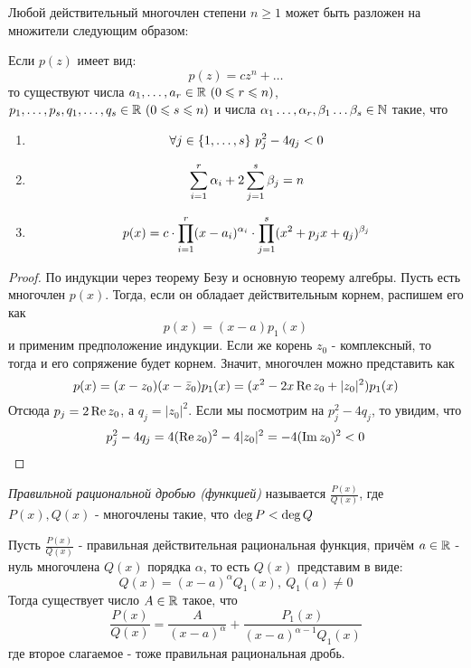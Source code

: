 \begin{corollary}
	Любой действительный многочлен степени $n \ge 1$ может быть разложен на множители следующим образом:
	
	Если $p(z)$ имеет вид:
	\[
		p(z) = cz^n + \ldots
	\]
	то существуют числа $a_1, \ldots, a_r \in \R\ (0 \le r \le n)$, $p_1, \ldots, p_s, q_1, \ldots, q_s \in \mathbb{R}\ (0 \leqslant s \leqslant n)$ и числа $\alpha_1 \ldots, \alpha_r, \beta_1 \ldots \beta_s \in \mathbb{N}$ такие, что
	\begin{enumerate}
		\item \[
			\forall j \in \{1, \ldots, s\}\ p_j^2 - 4q_j < 0
		\]
		
		\item \[
			\sum\limits_{i = 1}^r \alpha_i + 2\sum\limits_{j = 1}^s \beta_j = n
		\]
		
		\item \[
			p(x) = c \cdot \prod\limits_{i = 1}^r (x - a_i)^{\alpha_i} \cdot \prod\limits_{j = 1}^s (x^2 + p_j x + q_j)^{\beta_j}
		\]
	\end{enumerate}
\end{corollary}

\begin{proof}
	По индукции через теорему Безу и основную теорему алгебры. Пусть есть многочлен $p(x)$. Тогда, если он обладает действительным корнем, распишем его как
	\[
		p(x) = (x - a)p_1(x)
	\]
	и применим предположение индукции. Если же корень $z_0$ - комплексный, то тогда и его сопряжение будет корнем. Значит, многочлен можно представить как
	\[
		p(x) = (x - z_0)(x - \bar{z}_0)p_1(x) = (x^2 - 2x\operatorname{Re} z_0 + |z_0|^2)p_1(x)
	\]
	Отсюда $p_j = 2\operatorname{Re} z_0$, а $q_j = |z_0|^2$. Если мы посмотрим на $p^2_j - 4q_j$, то увидим, что
	\[
		p^2_j - 4q_j = 4(\operatorname{Re} z_0)^2 - 4|z_0|^2 = -4(\operatorname{Im} z_0)^2 < 0
	\]
\end{proof}

\begin{definition}
	\textit{Правильной рациональной дробью (функцией)} называется $\frac{P(x)}{Q(x)}$, где $P(x), Q(x)$ - многочлены такие, что $\operatorname{deg} P < \operatorname{deg} Q$
\end{definition}

\begin{lemma}
	Пусть $\frac{P(x)}{Q(x)}$ - правильная действительная рациональная функция, причём $a \in \mathbb{R}$ - нуль многочлена $Q(x)$ порядка $\alpha$, то есть $Q(x)$ представим в виде:
	\[
		Q(x) = (x - a)^\alpha Q_1(x),\ Q_1(a) \neq 0
	\]
	Тогда существует число $A \in \mathbb{R}$ такое, что
	\[
		\frac{P(x)}{Q(x)} = \frac{A}{(x - a)^\alpha} + \frac{P_1(x)}{(x - a)^{\alpha - 1} Q_1(x)}
	\]
	где второе слагаемое - тоже правильная рациональная дробь.
\end{lemma}

